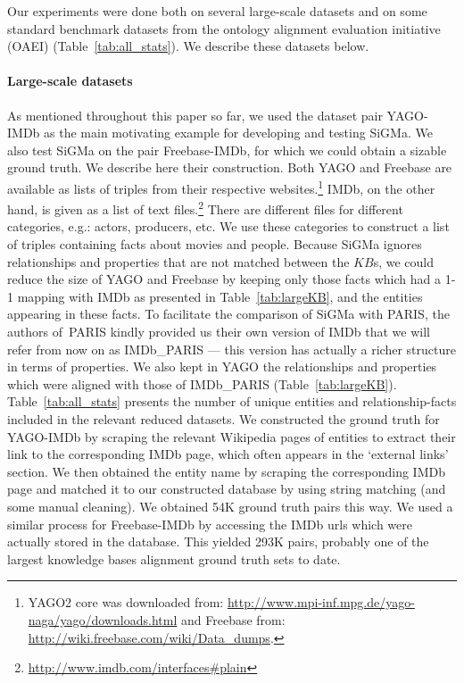 \documentclass{sig-alternate}
\newcommand{\ts}[1]{\textsf{#1}}
\newcommand{\KB}{K\!B}
\begin{document}
Our experiments were done both on several large-scale datasets and on
some standard benchmark datasets from the ontology alignment evaluation
initiative (OAEI) (Table~\ref{tab:all_stats}). We describe these datasets below.


\paragraph*{Large-scale datasets}
As mentioned throughout this paper so far, we used the dataset pair
\textsf{YAGO}-\textsf{IMDb}  as the main motivating example for
developing and testing \ts{SiGMa}. We also test \ts{SiGMa} on the pair
\ts{Freebase}-\textsf{IMDb}, for which we could obtain a sizable
ground truth. We describe here their construction. Both \textsf{YAGO}
and \ts{Freebase} are available as lists of triples from their respective
websites.\footnote{\textsf{YAGO2 core} was downloaded from:
  \href{http://www.mpi-inf.mpg.de/yago-naga/yago/downloads.html}{\small{http://www.mpi-inf.mpg.de/yago-naga/yago/downloads.html}}
  and \textsf{Freebase} from:
  \href{http://wiki.freebase.com/wiki/Data\_dumps}{\small{http://wiki.freebase.com/wiki/Data\_dumps}}.}
\textsf{IMDb}, on the other hand, is given as a list of text
files.\footnote{\href{http://www.imdb.com/interfaces\#plain}{http://www.imdb.com/interfaces\#plain}} There are
different files for different categories, e.g.: actors, producers,
etc. We use these categories to construct a list of triples containing
facts about movies and people. Because \ts{SiGMa} ignores
relationships and properties that are not matched between the $\KB$s,
we could reduce the size of \textsf{YAGO} and \ts{Freebase} by keeping
only those facts which had a 1-1 mapping with \ts{IMDb} as presented in Table~\ref{tab:largeKB}, and the entities appearing in these facts. To facilitate the comparison of \ts{SiGMa} with \ts{PARIS}, the authors of~\ts{PARIS} kindly provided us their own version of \ts{IMDb} that we will refer from now on as \textsf{IMDb\_PARIS} --- this version has actually a richer structure in terms of properties. We also kept in \textsf{YAGO} the relationships and properties which were aligned with those of \textsf{IMDb\_PARIS} (Table~\ref{tab:largeKB}). Table~\ref{tab:all_stats} presents the number of unique entities and relationship-facts included in the relevant reduced datasets. We constructed the ground truth for \textsf{YAGO}-\textsf{IMDb} by scraping the relevant Wikipedia pages of entities to extract their link to the corresponding \textsf{IMDb} page, which often appears in the `external links' section. We then obtained the entity name by scraping the corresponding \textsf{IMDb} page and matched it to our constructed database by using string matching (and some manual cleaning). We obtained 54K ground truth pairs this way. We used a similar process for \ts{Freebase}-\textsf{IMDb} by accessing the \textsf{IMDb} urls which were actually stored in the database. This yielded 293K pairs, probably one of the largest knowledge bases alignment ground truth sets to date.
\end{document}
